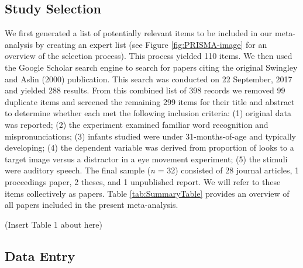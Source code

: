 \documentclass[
  english,
  man, noextraspace]{apa6}
\newenvironment{lltable}{\begin{landscape}\begin{center}\begin{ThreePartTable}}{\end{ThreePartTable}\end{center}\end{landscape}}
\begin{document}
\begin{lltable}
{}

\end{lltable}

\hypertarget{study-selection}{%
\subsection{Study Selection}\label{study-selection}}

We first generated a list of potentially relevant items to be included in our meta-analysis by creating an expert list (see Figure \ref{fig:PRISMA-image} for an overview of the selection process). This process yielded 110 items. We then used the Google Scholar search engine to search for papers citing the original Swingley and Aslin (2000) publication. This search was conducted on 22 September, 2017 and yielded 288 results. From this combined list of 398 records we removed 99 duplicate items and screened the remaining 299 items for their title and abstract to determine whether each met the following inclusion criteria: (1) original data was reported; (2) the experiment examined familiar word recognition and mispronunciations; (3) infants studied were under 31-months-of-age and typically developing; (4) the dependent variable was derived from proportion of looks to a target image versus a distractor in a eye movement experiment; (5) the stimuli were auditory speech. The final sample (\emph{n} = 32) consisted of 28 journal articles, 1 proceedings paper, 2 theses, and 1 unpublished report. We will refer to these items collectively as papers. Table \ref{tab:SummaryTable} provides an overview of all papers included in the present meta-analysis.

(Insert Table 1 about here)

\hypertarget{data-entry}{%
\subsection{Data Entry}\label{data-entry}}
\end{document}
